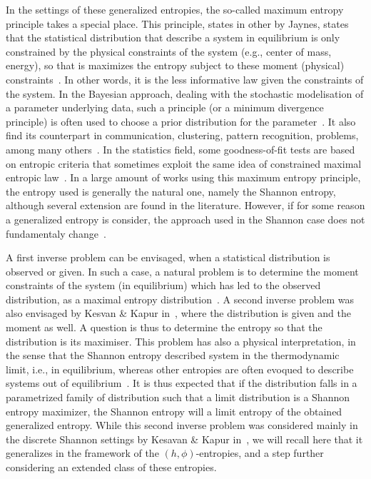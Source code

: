 \documentclass[english,sort&compress]{elsarticle}
\theoremstyle{definition}
\theoremstyle{plain}
\theoremstyle{plain}
\begin{document}
{  In the settings of these  generalized entropies, the so-called maximum entropy
  principle takes a  special place.  This principle, states  in other by Jaynes,
  states that the statistical distribution that describe a system in equilibrium
  is only constrained by the physical constraints of the system (e.g., center of
  mass,  energy), so  that  is maximizes  the  entropy subject  to these  moment
  (physical)  constraints~\cite{Jay57,  Jay57:2,  Kap89, Arn01,  CovTho06}.   In
  other  words, it  is the  less informative  law given  the constraints  of the
  system.  In the Bayesian approach, dealing with the stochastic modelisation of
  a  parameter  underlying data,  such  a  principle  (or a  minimum  divergence
  principle)   is  often   used  to   choose  a   prior  distribution   for  the
  parameter~\cite{Jay68, Fou90,  Csi91, Bas13,  FriSri08, Rob07}.  It  also find
  its counterpart  in communication, clustering,  pattern recognition, problems,
  among many  others~\cite{Kap89, JonByr90,  Arn01, HerMa02, ParBer09}.   In the
  statistics field,  some goodness-of-fit tests  are based on  entropic criteria
  that  sometimes  exploit  the   same  idea  of  constrained  maximal  entropic
  law~\cite{Vas76, Gok83, Son02, Leq14, Leq15,  GirReg15}.  In a large amount of
  works using this maximum entropy  principle, the entropy used is generally the
  natural one, namely the Shannon  entropy, although several extension are found
  in  the literature.   However, if  for some  reason a  generalized  entropy is
  consider,  the  approach  used  in  the Shannon  case  does  not  fundamentaly
  change~\cite{KesKap89, KesKap90, BorLew91:03, BorLew91:05, BorLew93}.

  A first inverse  problem can be envisaged, when  a statistical distribution is
  observed  or given. In  such a  case, a  natural problem  is to  determine the
  moment  constraints  of the  system  (in equilibrium)  which  has  led to  the
  observed  distribution,  as  a  maximal  entropy  distribution~\cite{KesKap89,
    KesKap90}. A  second inverse problem was  also envisaged by  Kesvan \& Kapur
  in~\cite{KesKap89, KesKap90},  where the distribution is given  and the moment
  as well. A question is thus  to determine the entropy so that the distribution
  is  its maximiser. This  problem has  also a  physical interpretation,  in the
  sense that  the Shannon entropy  described system in the  thermodynamic limit,
  i.e., in  equilibrium, whereas other  entropies are often evoqued  to describe
  systems  out  of equilibrium~\cite{Tsa88,  TsaMen98,  Tsa99, Tsa09,  EssSch00,
    ParBir05}.   It  is  thus expected  that  if  the  distribution falls  in  a
  parametrized  family of  distribution  such  that a  limit  distribution is  a
  Shannon entropy  maximizer, the  Shannon entropy will  a limit entropy  of the
  obtained  generalized   entropy.   While  this  second   inverse  problem  was
  considered  mainly  in the  discrete  Shannon  settings  by Kesavan  \&  Kapur
  in~\cite{KesKap89, KesKap90}, we  will recall here that it  generalizes in the
  framework  of the  $(h,\phi)$-entropies,  and a  step  further considering  an
  extended class of these entropies.}
\end{document}
